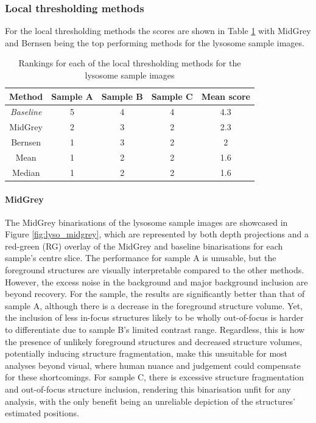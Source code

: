 \subsubsection{Local thresholding methods}
For the local thresholding methods the scores are shown in Table \ref{tab:lyso_local_ranks} with MidGrey and Bernsen being the top performing methods for the lysosome sample images.
\begin{table}[hb!]
	\centering
	\begin{tabular}{|c|c|c|c|c|}
		\hline
		\textbf{Method} & \textbf{Sample A} & \textbf{Sample B} & \textbf{Sample C} & \textbf{Mean score} \\
		\hline
		\textit{Baseline} & 5 & 4 & 4 & 4.3 \\
		\hline
		MidGrey & 2 & 3 & 2 & 2.3 \\
		\hline
		Bernsen & 1 & 3 & 2 & 2 \\
		\hline
		Mean & 1 & 2 & 2 & 1.6 \\
		\hline
		Median & 1 & 2 & 2 & 1.6 \\
		\hline
	\end{tabular}
	\caption{Rankings for each of the local thresholding methods for the lysosome sample images}
	\label{tab:lyso_local_ranks}
\end{table}
\FloatBarrier

\paragraph{MidGrey} The MidGrey binarisations of the lysosome sample images are showcased in Figure \ref{fig:lyso_midgrey}, which are represented by both depth projections and a red-green (RG) overlay of the MidGrey and baseline binarisations for each sample's centre slice. The performance for sample A is unusable, but the foreground structures are visually interpretable compared to the other methods. However, the excess noise in the background and major background inclusion are beyond recovery. For the sample, the results are significantly better than that of sample A, although there is a decrease in the foreground structure volume. Yet, the inclusion of less in-focus structures likely to be wholly out-of-focus is harder to differentiate due to sample B's limited contrast range. Regardless, this is how the presence of unlikely foreground structures and decreased structure volumes, potentially inducing structure fragmentation, make this unsuitable for most analyses beyond visual, where human nuance and judgement could compensate for these shortcomings. For sample C, there is excessive structure fragmentation and out-of-focus structure inclusion, rendering this binarisation unfit for any analysis, with the only benefit being an unreliable depiction of the structures' estimated positions.

